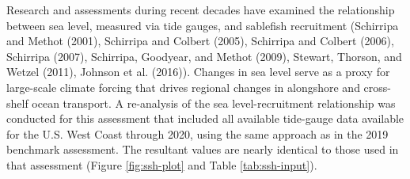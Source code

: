\documentclass[11pt,
  english,
  a4paper,
]{article}
\begin{document}
Research and assessments during recent decades have examined the relationship between sea level, measured via tide gauges, and sablefish recruitment ({Schirripa and Methot (2001)\leavevmode\tagmcend\tagstructend}, {Schirripa and Colbert (2005)\leavevmode\tagmcend\tagstructend}, {Schirripa and Colbert (2006)\leavevmode\tagmcend\tagstructend}, {Schirripa (2007)\leavevmode\tagmcend\tagstructend}, {Schirripa, Goodyear, and Methot (2009)\leavevmode\tagmcend\tagstructend}, {Stewart, Thorson, and Wetzel (2011)\leavevmode\tagmcend\tagstructend}, {Johnson et al. (2016)\leavevmode\tagmcend\tagstructend}). Changes in sea level serve as a proxy for large-scale climate forcing that drives regional changes in alongshore and cross-shelf ocean transport. A re-analysis of the sea level-recruitment relationship was conducted for this assessment that included all available tide-gauge data available for the U.S. West Coast through 2020, using the same approach as in the 2019 benchmark assessment. The resultant values are nearly identical to those used in that assessment (Figure \ref{fig:ssh-plot} and Table \ref{tab:ssh-input}).

\leavevmode\tagmcend\tagstructend\par
\end{document}

